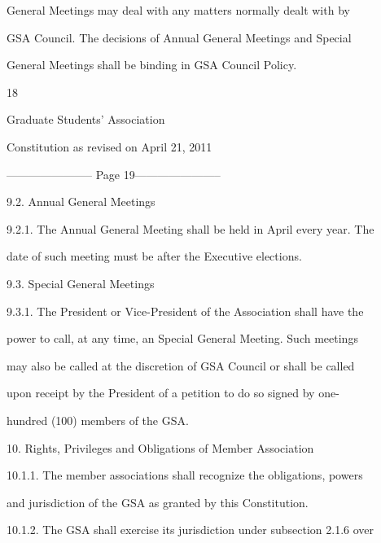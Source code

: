         General  Meetings may  deal  with  any  matters normally  dealt with  by  

        GSA  Council. The decisions of Annual General Meetings and Special  

        General Meetings shall be binding in GSA Council Policy.  

                                                

                                             18  



                               Graduate Students’ Association  



                          Constitution as revised on April 21, 2011  


----------------------- Page 19-----------------------

9.2.        Annual General Meetings  



9.2.1. The  Annual  General  Meeting  shall  be  held  in  April  every  year.  The  

        date of such meeting must be after the Executive elections.  



9.3.        Special General Meetings  



9.3.1. The  President  or  Vice-President  of  the  Association  shall  have  the  

        power to call, at any time, an Special General Meeting. Such meetings  

        may also be called at the discretion of  GSA  Council or shall be called  

        upon  receipt  by  the  President  of  a  petition  to  do  so  signed  by  one- 

        hundred (100) members of the GSA.  



  



10.  Rights, Privileges and Obligations of Member Association  



10.1.1.     The  member  associations  shall  recognize  the  obligations,  powers  

        and jurisdiction of the GSA as granted by this Constitution.  



10.1.2.     The GSA shall exercise its jurisdiction under subsection 2.1.6 over  

